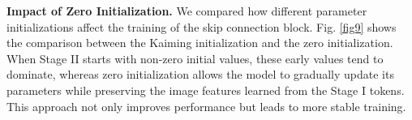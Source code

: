 \begin{table} [t]
    \vspace{-6pt}
    \caption{\textbf{Ablation study results on the UPENN-GBM}. }
    \label{table4}
    \vspace{3pt}
    \setlength{\tabcolsep}{8pt} 
    \centering
    \vspace{-6pt}
\end{table}


\vspace{3pt}
\noindent \textbf{Impact of Zero Initialization.} We compared how different parameter initializations affect the training of the skip connection block. Fig. \ref{fig9} shows the comparison between the Kaiming initialization \cite{he2015delving} and the zero initialization. When Stage II starts with non-zero initial values, these early values tend to dominate, whereas zero initialization allows the model to gradually update its parameters while preserving the image features learned from the Stage I tokens. This approach not only improves performance but leads to more stable training.
